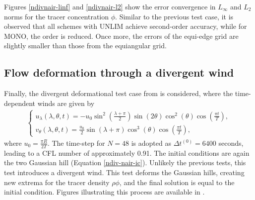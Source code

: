 \documentclass[preprint,12pt]{elsarticle}
\begin{document}
\begin{linenumbers}
Figures \ref{ndivnair-linf} and \ref{ndivnair-l2} show the error convergence in $L_{\infty}$ and $L_{2}$ norms for the  tracer concentration $\phi$.
Similar to the previous test case, it is observed that all schemes with UNLIM achieve second-order accuracy, while for MONO, the order is reduced.
Once more, the errors of the equi-edge grid are slightly smaller than those from the equiangular grid.

\subsection{Flow deformation through a divergent wind}
Finally, the divergent deformational test case from \cite{nair:2010} is considered, where the time-dependent winds are given by
\begin{align}
	\label{div-nair-wind}
	\begin{cases}
		u_\lambda(\lambda,\theta,t) =-u_0\sin^2(\frac{\lambda+\pi}{2})\sin(2\theta)\cos^2(\theta)\cos(\frac{\pi t}{T}),\\
		v_\theta(\lambda,\theta,t) = \frac{u_0}{2}\sin(\lambda+\pi)\cos^3(\theta)\cos(\frac{\pi t}{T}),
	\end{cases}
\end{align}
where $u_0 = \frac{\pi R}{2T}$.
The time-step for $N=48$ is adopted as $\Delta t^{(0)} = 6400$ seconds, leading to a CFL number of approximately 0.91. 
The initial conditions are again the two Gaussian hill (Equation \eqref{ndiv-nair-ic}).
Unlikely the previous tests, this test introduces a divergent wind.
This test deforms the Gaussian hills, creating new extrema for the tracer density $\rho \phi$, and the final solution is equal to the initial condition. 
Figures illustrating this process are available in \cite{nair:2010}.


\end{linenumbers}
\end{document}
